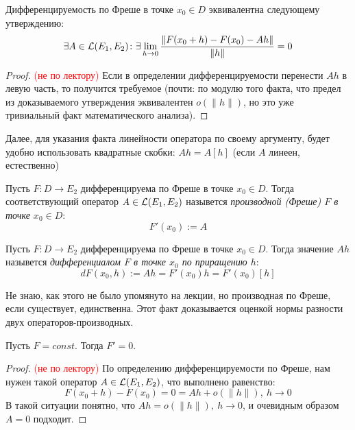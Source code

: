\begin{proposition}
	Дифференцируемость по Фреше в точке $x_0 \in D$ эквивалентна следующему утверждению:
	\[
		\exists A \in \mathcal{L}(E_1, E_2) \colon \exists \lim_{h \to 0} \frac{\|F(x_0 + h) - F(x_0) - Ah\|}{\|h\|} = 0
	\]
\end{proposition}

\begin{proof} \textcolor{red}{(не по лектору)}
	Если в определении дифференцируемости перенести $Ah$ в левую часть, то получится требуемое (почти: по модулю того факта, что предел из доказываемого утверждения эквивалентен $o(\|h\|)$, но это уже тривиальный факт математического анализа).
\end{proof}

\begin{anote}
	Далее, для указания факта линейности оператора по своему аргументу, будет удобно использовать квадратные скобки: $Ah = A[h]$ (если $A$ линеен, естественно)
\end{anote}

\begin{definition}
	Пусть $F \colon D \to E_2$ дифференцируема по Фреше в точке $x_0 \in D$. Тогда соответствующий оператор $A \in \mathcal{L}(E_1, E_2)$ назывется \textit{производной (Фреше) $F$ в точке $x_0 \in D$}:
	\[
		F'(x_0) := A
	\]
\end{definition}

\begin{definition}
	Пусть $F \colon D \to E_2$ дифференцируема по Фреше в точке $x_0 \in D$. Тогда значение $Ah$ назывется \textit{дифференциалом $F$ в точке $x_0$ по приращению $h$}:
	\[
		dF(x_0, h) := Ah = F'(x_0)h = F'(x_0)[h]
	\]
\end{definition}

\begin{anote}
	Не знаю, как этого не было упомянуто на лекции, но производная по Фреше, если существует, единственна. Этот факт доказывается оценкой нормы разности двух операторов-производных.
\end{anote}

\begin{proposition}
	Пусть $F = const$. Тогда $F' = 0$.
\end{proposition}

\begin{proof} \textcolor{red}{(не по лектору)}
	По определению дифференцируемости по Фреше, нам нужен такой оператор $A \in \mathcal{L}(E_1, E_2)$, что выполнено равенство:
	\[
		F(x_0 + h) - F(x_0) = 0 = Ah + o(\|h\|),\ h \to 0
	\]
	В такой ситуации понятно, что $Ah = o(\|h\|),\ h \to 0$, и очевидным образом $A = 0$ подходит.
\end{proof}

